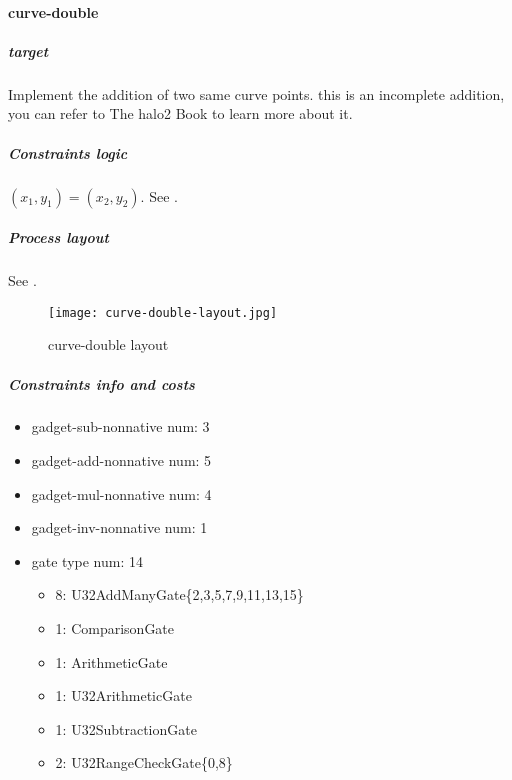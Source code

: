 \paragraph{curve-double}

\subparagraph{target}
Implement the addition of two same curve points. this is an incomplete addition, you can refer to The halo2 Book \cite{website:halo2-book} to learn more about it.

\subparagraph{Constraints logic}
$(x_1,y_1) = (x_2,y_2)$. See .

\subparagraph{Process layout}
See .
\begin{figure}[!ht]
    \centering
    \texttt{[image: curve-double-layout.jpg]}
    \caption{curve-double layout}
    \label{fig:curve-double-layout}
\end{figure}

\subparagraph{Constraints info and costs}
\begin{itemize}
    \item gadget-sub-nonnative num: 3
    \item gadget-add-nonnative num: 5
    \item gadget-mul-nonnative num: 4
    \item gadget-inv-nonnative num: 1
    \item gate type num: 14
        \begin{itemize}
            \item 8: U32AddManyGate\{2,3,5,7,9,11,13,15\}
            \item 1: ComparisonGate
            \item 1: ArithmeticGate
            \item 1: U32ArithmeticGate
            \item 1: U32SubtractionGate
            \item 2: U32RangeCheckGate\{0,8\}
        \end{itemize}
\end{itemize}
